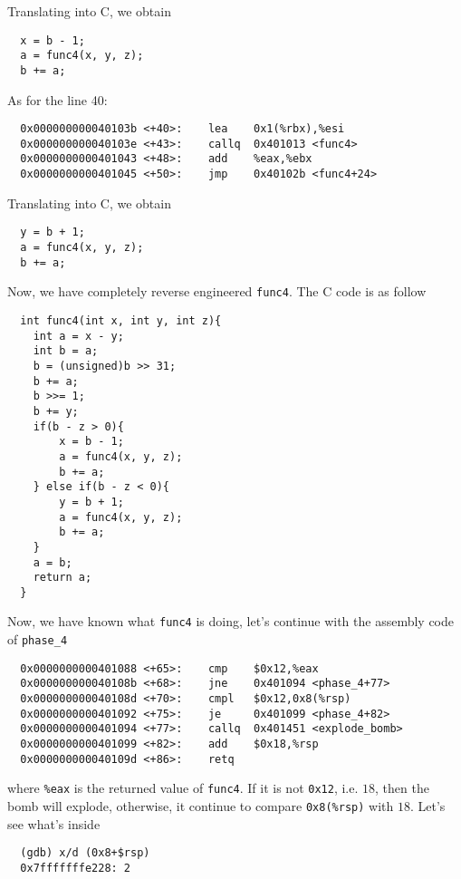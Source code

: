 Translating into C, we obtain
{\renewcommand\fcolorbox[4][]{\textcolor{black}{\strut#4}}
\begin{verbatim}
  x = b - 1;
  a = func4(x, y, z);
  b += a;
\end{verbatim}
}\noindent
As for the line 40:
{\renewcommand\fcolorbox[4][]{\textcolor{cyan}{\strut#4}}
\begin{verbatim}
  0x000000000040103b <+40>:    lea    0x1(%rbx),%esi
  0x000000000040103e <+43>:    callq  0x401013 <func4>
  0x0000000000401043 <+48>:    add    %eax,%ebx
  0x0000000000401045 <+50>:    jmp    0x40102b <func4+24>
\end{verbatim}
}\noindent
Translating into C, we obtain
{\renewcommand\fcolorbox[4][]{\textcolor{black}{\strut#4}}
\begin{verbatim}
  y = b + 1;
  a = func4(x, y, z);
  b += a;
\end{verbatim}
}\noindent
Now, we have completely reverse engineered \verb+func4+. The C code is as follow
{\renewcommand\fcolorbox[4][]{\textcolor{black}{\strut#4}}
\begin{verbatim}
  int func4(int x, int y, int z){
    int a = x - y;
    int b = a;
    b = (unsigned)b >> 31;
    b += a;
    b >>= 1;
    b += y;
    if(b - z > 0){
        x = b - 1;
        a = func4(x, y, z);
        b += a;
    } else if(b - z < 0){
        y = b + 1;
        a = func4(x, y, z);
        b += a;
    }
    a = b;
    return a;
  }
\end{verbatim}
}\noindent
Now, we have known what \verb+func4+ is doing, let's continue with the assembly code of \verb+phase_4+
{\renewcommand\fcolorbox[4][]{\textcolor{cyan}{\strut#4}}
\begin{verbatim}
  0x0000000000401088 <+65>:    cmp    $0x12,%eax
  0x000000000040108b <+68>:    jne    0x401094 <phase_4+77>
  0x000000000040108d <+70>:    cmpl   $0x12,0x8(%rsp)
  0x0000000000401092 <+75>:    je     0x401099 <phase_4+82>
  0x0000000000401094 <+77>:    callq  0x401451 <explode_bomb>
  0x0000000000401099 <+82>:    add    $0x18,%rsp
  0x000000000040109d <+86>:    retq
\end{verbatim}
}\noindent
where \verb+%eax+ is the returned value of \verb+func4+. If it is not \verb+0x12+, i.e. $18$, then the bomb will explode, otherwise, it continue to compare \verb+0x8(%rsp)+ with $18$. Let's see what's inside
\begin{verbatim}
  (gdb) x/d (0x8+$rsp)
  0x7fffffffe228: 2
\end{verbatim}
